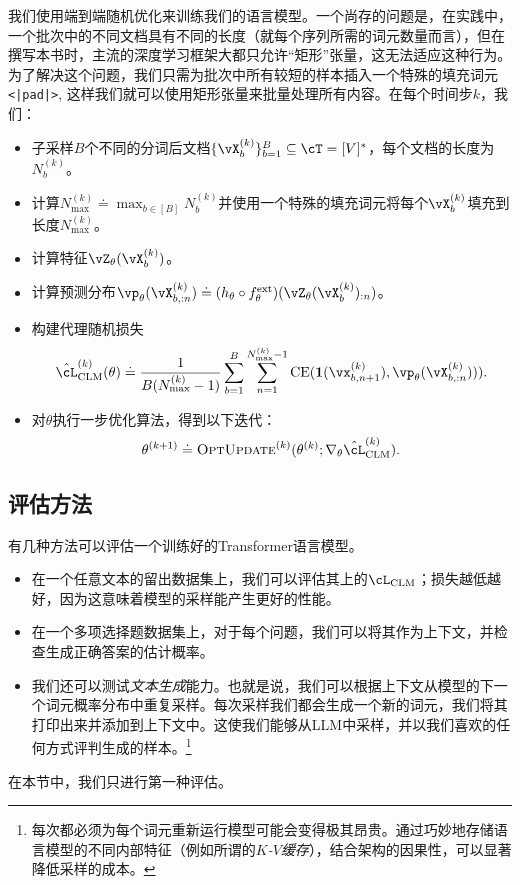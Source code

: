 \documentclass[../../book-main_zh.tex]{subfiles}
\begin{document}
我们使用端到端随机优化来训练我们的语言模型。一个尚存的问题是，在实践中，一个批次中的不同文档具有不同的长度（就每个序列所需的词元数量而言），但在撰写本书时，主流的深度学习框架大都只允许“矩形”张量，这无法适应这种行为。为了解决这个问题，我们只需为批次中所有较短的样本插入一个特殊的填充词元\texttt{<|pad|>}, 这样我们就可以使用矩形张量来批量处理所有内容。在每个时间步\(k\)，我们：
\begin{itemize}
    \item 子采样\(B\)个不同的分词后文档\(\{\vX_{b}^{(k)}\}_{b = 1}^{B} \subseteq \cT = [V]^{*}\)，每个文档的长度为\(N_{b}^{(k)}\)。
    \item 计算\(N_{\max}^{(k)} \doteq \max_{b \in [B]}N_{b}^{(k)}\)并使用一个特殊的填充词元将每个\(\vX_{b}^{(k)}\)填充到长度\(N_{\max}^{(k)}\)。
    \item 计算特征\(\vZ_{\theta}(\vX_{b}^{(k)})\)。
    \item 计算预测分布\(\vp_{\theta}(\vX_{b, :n}^{(k)}) \doteq (h_{\theta} \circ f_{\theta}^{\ext})(\vZ_{\theta}(\vX_{b}^{(k)})_{:n})\)。
    \item 构建代理随机损失
    \begin{equation}
        \hat{\cL}_{\mathrm{CLM}}^{(k)}(\theta) \doteq \frac{1}{B(N_{\max}^{(k)} - 1)}\sum_{b = 1}^{B}\sum_{n = 1}^{N_{\max}^{(k)}-1}\CE(\vone(\vx_{b, n + 1}^{(k)}), \vp_{\theta}(\vX_{b, :n}^{(k)}))).
    \end{equation}
    \item 对\(\theta\)执行一步优化算法，得到以下迭代：
    \begin{equation}
        \theta^{(k + 1)} \doteq \textsc{OptUpdate}^{(k)}(\theta^{(k)}; \nabla_{\theta}\hat{\cL}_{\mathrm{CLM}}^{(k)}).
    \end{equation}
\end{itemize}

\subsection{评估方法} \label{sub:clm_text_evals}

有几种方法可以评估一个训练好的Transformer语言模型。
\begin{itemize}
    \item 在一个任意文本的留出数据集上，我们可以评估其上的\(\cL_{\mathrm{CLM}}\)；损失越低越好，因为这意味着模型的采样能产生更好的性能。
    \item 在一个多项选择题数据集上，对于每个问题，我们可以将其作为上下文，并检查生成正确答案的估计概率。
    \item 我们还可以测试\textit{文本生成}能力。也就是说，我们可以根据上下文从模型的下一个词元概率分布中重复采样。每次采样我们都会生成一个新的词元，我们将其打印出来并添加到上下文中。这使我们能够从LLM中采样，并以我们喜欢的任何方式评判生成的样本。\footnote{每次都必须为每个词元重新运行模型可能会变得极其昂贵。通过巧妙地存储语言模型的不同内部特征（例如所谓的\textit{\(K\)-\(V\)缓存}），结合架构的因果性，可以显著降低采样的成本。}
\end{itemize}
在本节中，我们只进行第一种评估。
\end{document}
